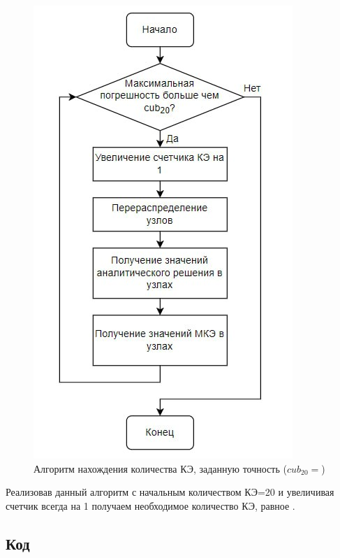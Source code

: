 \begin{figure}[H]
\centerline{\includegraphics[scale = 0.65]{labs/img/img2.jpg}}
\caption{Алгоритм нахождения количества КЭ, заданную точность ($cub_{20} = $)}
\label{alg}
\end{figure}

Реализовав данный алгоритм с начальным количеством КЭ=20 и увеличивая счетчик всегда на 1 получаем необходимое количество КЭ, равное .

\subsection{Код}

